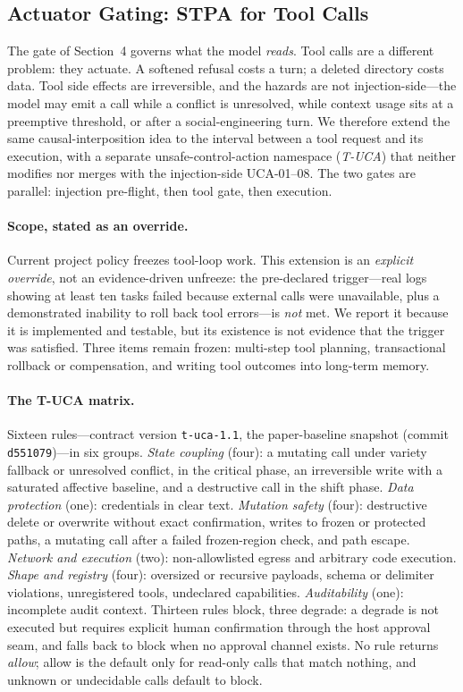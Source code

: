 \subsection{Actuator Gating: {STPA} for Tool Calls}\label{sec:actuator}

The gate of Section~4 governs what the model \emph{reads}. Tool calls are a
different problem: they actuate. A softened refusal costs a turn; a deleted
directory costs data. Tool side effects are irreversible, and the hazards are not
injection-side---the model may emit a call while a conflict is unresolved, while
context usage sits at a preemptive threshold, or after a social-engineering
turn. We therefore extend the same causal-interposition idea to the interval
between a tool request and its execution, with a separate unsafe-control-action
namespace (\emph{T-UCA}) that neither modifies nor merges with the
injection-side UCA-01--08. The two gates are parallel: injection pre-flight,
then tool gate, then execution.

\paragraph{Scope, stated as an override.} Current project policy freezes
tool-loop work. This extension is an \emph{explicit override}, not an
evidence-driven unfreeze: the pre-declared trigger---real logs showing at least
ten tasks failed because external calls were unavailable, plus a demonstrated
inability to roll back tool errors---is \emph{not} met. We report it because it
is implemented and testable, but its existence is not evidence that the trigger
was satisfied. Three items remain frozen: multi-step tool planning,
transactional rollback or compensation, and writing tool outcomes into long-term
memory.

\paragraph{The T-UCA matrix.} Sixteen rules---contract version
\texttt{t-uca-1.1}, the paper-baseline snapshot (commit \texttt{d551079})---in six
groups. \emph{State coupling} (four): a mutating call
under variety fallback or unresolved conflict, in the critical phase, an
irreversible write with a saturated affective baseline, and a destructive call in
the shift phase. \emph{Data protection} (one): credentials in clear text.
\emph{Mutation safety} (four): destructive delete or overwrite without exact
confirmation, writes to frozen or protected paths, a mutating call after a failed
frozen-region check, and path escape. \emph{Network and execution} (two):
\mbox{non-allowlisted} egress and arbitrary code execution. \emph{Shape and registry}
(four): oversized or recursive payloads, schema or delimiter violations,
unregistered tools, undeclared capabilities. \emph{Auditability} (one):
incomplete audit context. Thirteen rules block, three degrade: a degrade is not
executed but requires explicit human confirmation through the host approval
seam, and falls back to block when no approval channel exists. No rule returns
\emph{allow}; allow is the default only for read-only calls that match nothing,
and unknown or undecidable calls default to block.

